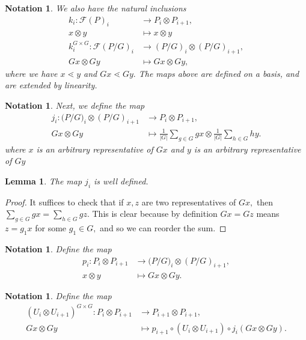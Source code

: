 \documentclass{amsart}
\newtheorem{lem}[subsubsection]{Lemma}
\newtheorem{note}[subsubsection]{Notation}
\begin{document}
\begin{note}
We also have the natural inclusions
\begin{align*}
	k_i:\mathcal F(P)_i &\rightarrow P_i \otimes P_{i+1},\\
	x\otimes y &\mapsto x\otimes y\\
	k_i^{G\times G}:\mathcal F(P/G)_i &\rightarrow (P/G)_i \otimes (P/G)_{i+1},\\
	Gx\otimes Gy &\mapsto Gx\otimes Gy,
\end{align*}
where we have $x \lessdot y$ and $Gx \lessdot Gy.$ The maps above are defined on a basis, and are extended by linearity.
\end{note}

\begin{note}
Next, we define the map
\begin{align*}
	j_i:\mathcal (P/G)_i \otimes (P/G)_{i+1} & \rightarrow P_i \otimes P_{i+1},\\
	Gx\otimes Gy &\mapsto \frac{1}{|G|}\sum_{g \in G}^{} gx\otimes \frac{1}{|G|}\sum_{h\in G}^{}hy.
\end{align*}
where $x$ is an arbitrary representative of $Gx$ and $y$ is an arbitrary representative of $Gy$
\end{note}

\begin{lem}
The map $j_i$ is well defined.
\end{lem}
\begin{proof}
It suffices to check that if $x,z$ are two representatives of $Gx,$ then $\sum_{g \in G}^{}gx = \sum_{h \in G}^{}gz.$ This is clear because by definition $Gx = Gz$ means $z = g_1x$ for some $g_1 \in G,$ and so we can reorder the sum.
\end{proof}

\begin{note}
Define the map
\begin{align*}
	p_i: P_i \otimes P_{i+1} &\rightarrow \mathcal (P/G)_i \otimes (P/G)_{i+1},\\
	x\otimes y &\mapsto Gx\otimes Gy.
\end{align*}
\end{note}

\begin{note}
Define the map 
\begin{align*}
	(U_i \otimes U_{i+1})^{G\times G}:P_i\otimes P_{i+1} &\rightarrow P_{i+1} \otimes P_{i+1},\\
	Gx \otimes Gy &\mapsto p_{i+1}\circ(U_i \otimes U_{i+1})\circ j_i(Gx\otimes Gy).
\end{align*}
\end{note}
\end{document}
